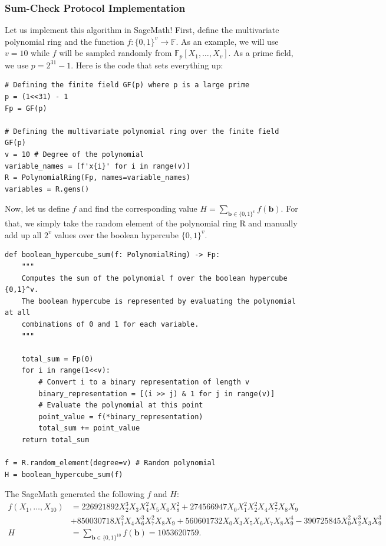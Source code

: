 \subsubsection{Sum-Check Protocol Implementation}

Let us implement this algorithm in SageMath! First, define the multivariate
polynomial ring and the function $f: \{0,1\}^v \to \mathbb{F}$. As an example,
we will use $v=10$ while $f$ will be sampled randomly from
$\mathbb{F}_p[X_1,\dots,X_v]$. As a prime field, we use $p=2^{31} - 1$. 
Here is the code that sets everything up:
\begin{verbatim}
# Defining the finite field GF(p) where p is a large prime
p = (1<<31) - 1
Fp = GF(p)

# Defining the multivariate polynomial ring over the finite field GF(p)
v = 10 # Degree of the polynomial
variable_names = [f'x{i}' for i in range(v)]
R = PolynomialRing(Fp, names=variable_names)
variables = R.gens()
\end{verbatim}

Now, let us define $f$ and find the corresponding value $H =
\sum_{\boldsymbol{b} \in \{0,1\}^v} f(\boldsymbol{b})$. For that, we
simply take the random element of the polynomial ring \textsf{R} and 
manually add up all $2^v$ values over the boolean hypercube $\{0,1\}^v$.
\begin{verbatim}
def boolean_hypercube_sum(f: PolynomialRing) -> Fp:
    """
    Computes the sum of the polynomial f over the boolean hypercube {0,1}^v.
    The boolean hypercube is represented by evaluating the polynomial at all
    combinations of 0 and 1 for each variable.
    """

    total_sum = Fp(0)
    for i in range(1<<v):
        # Convert i to a binary representation of length v
        binary_representation = [(i >> j) & 1 for j in range(v)]
        # Evaluate the polynomial at this point
        point_value = f(*binary_representation)
        total_sum += point_value
    return total_sum

f = R.random_element(degree=v) # Random polynomial
H = boolean_hypercube_sum(f)
\end{verbatim}

The SageMath generated the following $f$ and $H$:
\begin{align*}
    f(X_1,\dots,X_{10}) &= 226921892X_2^3X_3X_4^2X_5X_6X_8^2 + 274566947X_0X_1^2X_2^2X_4X_7^2X_8X_9 \\ 
    &+ 850030718X_1^2X_4X_6^3X_7^2X_8X_9 + 560601732X_0X_3X_5X_6X_7X_8X_9^4 - 390725845X_0^2X_2^3X_3X_9^3 \\
    H &= \sum_{\boldsymbol{b} \in \{0,1\}^{10}} f(\boldsymbol{b}) = 1053620759.
\end{align*}

